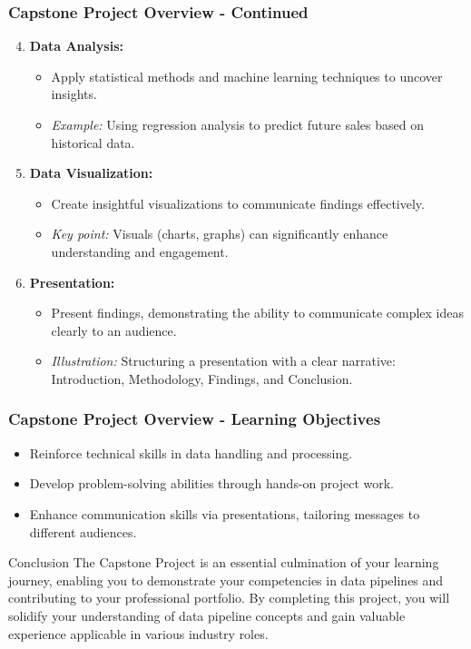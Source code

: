 \documentclass{beamer}
\begin{document}
\begin{frame}[fragile]
    \frametitle{Capstone Project Overview - Continued}
    \begin{enumerate}
        \setcounter{enumi}{3}
        \item \textbf{Data Analysis:}
            \begin{itemize}
                \item Apply statistical methods and machine learning techniques to uncover insights.
                \item \textit{Example:} Using regression analysis to predict future sales based on historical data.
            \end{itemize}

        \item \textbf{Data Visualization:}
            \begin{itemize}
                \item Create insightful visualizations to communicate findings effectively.
                \item \textit{Key point:} Visuals (charts, graphs) can significantly enhance understanding and engagement.
            \end{itemize}
        
        \item \textbf{Presentation:}
            \begin{itemize}
                \item Present findings, demonstrating the ability to communicate complex ideas clearly to an audience.
                \item \textit{Illustration:} Structuring a presentation with a clear narrative: Introduction, Methodology, Findings, and Conclusion.
            \end{itemize}
    \end{enumerate}
\end{frame}

\begin{frame}[fragile]
    \frametitle{Capstone Project Overview - Learning Objectives}
    \begin{itemize}
        \item Reinforce technical skills in data handling and processing.
        \item Develop problem-solving abilities through hands-on project work.
        \item Enhance communication skills via presentations, tailoring messages to different audiences.
    \end{itemize}
    
    \begin{block}{Conclusion}
        The Capstone Project is an essential culmination of your learning journey, enabling you to demonstrate your competencies in data pipelines and contributing to your professional portfolio. By completing this project, you will solidify your understanding of data pipeline concepts and gain valuable experience applicable in various industry roles.
    \end{block}
\end{frame}
\end{document}

